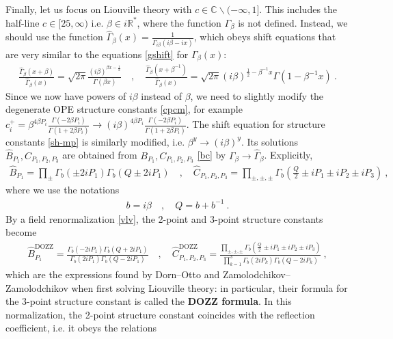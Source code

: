 \documentclass[12pt, a4paper]{article}
\newcommand{\myindex}[1]{\textbf{\boldmath #1}}
\theoremstyle{break}
\begin{document}
Finally, let us focus on Liouville theory with $c\in \mathbb{C}\backslash (-\infty,1]$. This includes the half-line $c\in [25,\infty)$ i.e. $\beta\in i\mathbb{R}^*$, where the function $\Gamma_\beta$ is not defined.
Instead, we should use the function $\hat{\Gamma}_\beta(x) = \frac{1}{\Gamma_{i\beta}(i\beta -ix)}$, which obeys shift equations that are very similar to the equations \eqref{gshift} for $\Gamma_\beta(x)$: 
\begin{align}
 \frac{\hat\Gamma_\beta(x+\beta)}{\hat\Gamma_\beta(x)} = \sqrt{2\pi}\frac{(i\beta)^{\beta x-\frac12}}{\Gamma(\beta x)}
\quad , \quad 
\frac{\hat\Gamma_\beta(x+\beta^{-1})}{\hat\Gamma_\beta(x)} = \sqrt{2\pi}(i\beta)^{\frac12-\beta^{-1}x}\Gamma(1-\beta^{-1}x) \ .
\label{hgshift}
\end{align}
Since we now have powers of $i\beta$ instead of $\beta$, we need to slightly modify the degenerate OPE structure constants \eqref{cpcm}, for example $c_i^+ = \beta^{4\beta P_i}\frac{\Gamma(-2\beta P_i)}{\Gamma(1+2\beta P_i)} \to (i\beta)^{4\beta P_i}\frac{\Gamma(-2\beta P_i)}{\Gamma(1+2\beta P_i)}$. The shift equation for structure constants \eqref{sh-mp} is similarly modified, i.e. $\beta^y \to (i\beta)^y$. Its solutions $\hat B_{P_1},\hat C_{P_1,P_2,P_3}$ are obtained from $B_{P_1},C_{P_1,P_2,P_3}$ \eqref{bc} by $\Gamma_\beta \to \hat\Gamma_\beta$. Explicitly,
\begin{align}
 \boxed{\hat B_{P_1} = \prod_\pm \Gamma_b\left(\pm 2iP_1\right)\Gamma_b\left(Q\pm 2iP_1\right)} \quad , \quad 
 \boxed{\hat C_{P_1,P_2,P_3} = \prod_{\pm,\pm,\pm} \Gamma_b\left(\tfrac{Q}{2} \pm iP_1\pm iP_2\pm iP_3\right)}\ ,
 \label{bci}
\end{align}
where we use the notations 
\begin{align}
 b = i\beta \quad , \quad Q = b + b^{-1} \ . 
 \label{bQ}
\end{align}
By a field renormalization \eqref{vlv}, the 2-point and 3-point structure constants become 
\begin{align}
 \hat B^\text{DOZZ}_{P_1} = \frac{\Gamma_b\left(- 2iP_1\right)\Gamma_b\left(Q+ 2iP_1\right)}{\Gamma_b\left( 2iP_1\right)\Gamma_b\left(Q- 2iP_1\right)} \quad , \quad 
 \hat C^\text{DOZZ}_{P_1,P_2,P_3} = \frac{\prod_{\pm,\pm,\pm} \Gamma_b\left(\tfrac{Q}{2} \pm iP_1\pm iP_2\pm iP_3\right)}{\prod_{k=1}^3 \Gamma_b(2iP_k)\Gamma_b(Q-2iP_k)}\ ,
 \label{dozz}
\end{align}
which are the expressions found by Dorn--Otto and Zamolodchikov--Zamolodchikov when first solving Liouville theory: in particular, their formula for the 3-point structure constant is called the \myindex{DOZZ formula}. In this normalization, the 2-point structure constant coincides with the reflection coefficient, i.e. it obeys the relations 
\end{document}
